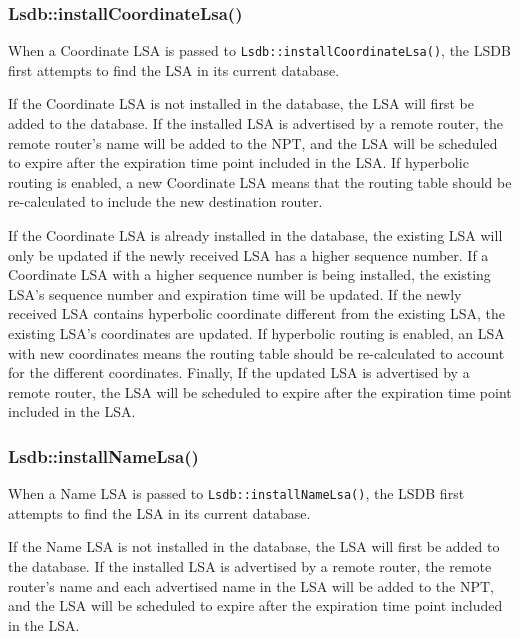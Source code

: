 \subsubsection{Lsdb::installCoordinateLsa()}

When a Coordinate LSA is passed to \texttt{Lsdb::installCoordinateLsa()}, the LSDB first attempts to find the LSA in its current database.

If the Coordinate LSA is not installed in the database, the LSA will first be added to the database.
If the installed LSA is advertised by a remote router, the remote router's name will be added to the NPT, and the LSA will be scheduled to expire after the expiration time point included in the LSA.
If hyperbolic routing is enabled, a new Coordinate LSA means that the routing table should be re-calculated to include the new destination router.

If the Coordinate LSA is already installed in the database, the existing LSA will only be updated if the newly received LSA has a higher sequence number.
If a Coordinate LSA with a higher sequence number is being installed, the existing LSA's sequence number and expiration time will be updated.
If the newly received LSA contains hyperbolic coordinate different from the existing LSA, the existing LSA's coordinates are updated.
If hyperbolic routing is enabled, an LSA with new coordinates means the routing table should be re-calculated to account for the different coordinates.
Finally, If the updated LSA is advertised by a remote router, the LSA will be scheduled to expire after the expiration time point included in the LSA.

\subsubsection{Lsdb::installNameLsa()}

When a Name LSA is passed to \texttt{Lsdb::installNameLsa()}, the LSDB first attempts to find the LSA in its current database.

If the Name LSA is not installed in the database, the LSA will first be added to the database.
If the installed LSA is advertised by a remote router, the remote router's name and each advertised name in the LSA will be added to the NPT,  and the LSA will be scheduled to expire after the expiration time point included in the LSA.

